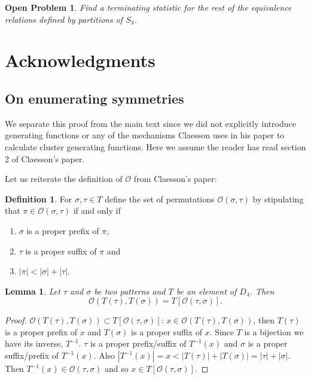 \documentclass[a4paper, 11pt, english]{article}
\newtheorem{lemma}[theorem]{Lemma}
\newtheorem{openproblem}[theorem]{Open Problem}
\theoremstyle{definition}
\newtheorem{definition}[theorem]{Definition}
\newcommand{\Sym}{S}
\newcommand{\Ocal}{\mathcal{O}}
\begin{document}
\begin{openproblem}
    Find a terminating statistic for the rest of the equivalence relations
    defined by partitions of $\Sym_3$.
\end{openproblem}

\section*{Acknowledgments}




\clearpage

\begin{appendices}
\section{On enumerating symmetries}
We separate this proof from the main text since we did not explicitly introduce
generating functions or any of the mechanisms Claesson uses in his paper to
calculate cluster generating functions. Here we assume the reader has read
section 2 of Claesson's paper.

Let us reiterate the definition of $\Ocal$ from Claesson's paper:
\begin{definition}
    For $\sigma, \tau \in T$ define the set of permutations $\Ocal(\sigma,
    \tau)$ by stipulating that $\pi \in \Ocal(\sigma, \tau)$ if and only if
    \begin{enumerate}
    \item $\sigma$ is a proper prefix of $\pi$,
    \item $\tau$ is a proper suffix of $\pi$ and
    \item $|\pi| < |\sigma| + |\tau|$.
    \end{enumerate}
\end{definition}

\begin{lemma}
Let $\tau$ and $\sigma$ be two patterns and $T$ be an element of $D_4$.
Then 
\[
    \Ocal(T(\tau), T(\sigma)) = T[\Ocal(\tau, \sigma)].
\]
\end{lemma}
\begin{proof}
    $\Ocal(T(\tau), T(\sigma)) \subset T[\Ocal(\tau, \sigma)]$: 
    $x \in \Ocal(T(\tau), T(\sigma))$, then $T(\tau)$ is a proper prefix of
    $x$ and $T(\sigma)$ is a proper suffix of $x$. Since $T$ is a bijection we
    have its inverse, $T^{-1}$. $\tau$ is a proper prefix/suffix of $T^{-1}(x)$ and 
    $\sigma$ is a proper suffix/prefix of $T^{-1}(x)$. Also $|T^{-1}(x)| = x <
    |T(\tau)| + |T(\sigma)| = |\tau| + |\sigma|$. Then $T^{-1}(x) \in \Ocal(\tau,
    \sigma)$ and so $x \in T[\Ocal(\tau, \sigma)]$.


\end{proof}
\end{appendices}
\end{document}
